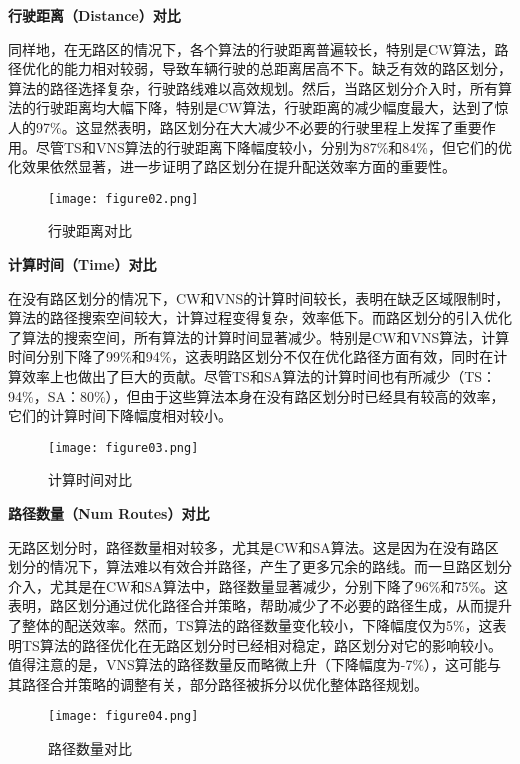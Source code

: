\documentclass[12pt,a4paper,twoside]{ctexbook}
\begin{document}
\textbf{行驶距离（Distance）对比}

同样地，在无路区的情况下，各个算法的行驶距离普遍较长，特别是CW算法，路径优化的能力相对较弱，导致车辆行驶的总距离居高不下。缺乏有效的路区划分，算法的路径选择复杂，行驶路线难以高效规划。然后，当路区划分介入时，所有算法的行驶距离均大幅下降，特别是CW算法，行驶距离的减少幅度最大，达到了惊人的97\%。这显然表明，路区划分在大大减少不必要的行驶里程上发挥了重要作用。尽管TS和VNS算法的行驶距离下降幅度较小，分别为87\%和84\%，但它们的优化效果依然显著，进一步证明了路区划分在提升配送效率方面的重要性。

\begin{figure}[H]
    \centering
    \texttt{[image: figure02.png]} %
    \caption{行驶距离对比}
    \label{fig:distance_comparison}
\end{figure}

\textbf{计算时间（Time）对比}

在没有路区划分的情况下，CW和VNS的计算时间较长，表明在缺乏区域限制时，算法的路径搜索空间较大，计算过程变得复杂，效率低下。而路区划分的引入优化了算法的搜索空间，所有算法的计算时间显著减少。特别是CW和VNS算法，计算时间分别下降了99\%和94\%，这表明路区划分不仅在优化路径方面有效，同时在计算效率上也做出了巨大的贡献。尽管TS和SA算法的计算时间也有所减少（TS：94\%，SA：80\%），但由于这些算法本身在没有路区划分时已经具有较高的效率，它们的计算时间下降幅度相对较小。

\begin{figure}[H]
    \centering
    \texttt{[image: figure03.png]} %
    \caption{计算时间对比}
    \label{fig:time_comparison}
\end{figure}

\textbf{路径数量（Num Routes）对比}

无路区划分时，路径数量相对较多，尤其是CW和SA算法。这是因为在没有路区划分的情况下，算法难以有效合并路径，产生了更多冗余的路线。而一旦路区划分介入，尤其是在CW和SA算法中，路径数量显著减少，分别下降了96\%和75\%。这表明，路区划分通过优化路径合并策略，帮助减少了不必要的路径生成，从而提升了整体的配送效率。然而，TS算法的路径数量变化较小，下降幅度仅为5\%，这表明TS算法的路径优化在无路区划分时已经相对稳定，路区划分对它的影响较小。值得注意的是，VNS算法的路径数量反而略微上升（下降幅度为-7\%），这可能与其路径合并策略的调整有关，部分路径被拆分以优化整体路径规划。

\begin{figure}[H]
    \centering
    \texttt{[image: figure04.png]} %
    \caption{路径数量对比}
    \label{fig:route_comparison}
\end{figure}
\end{document}
